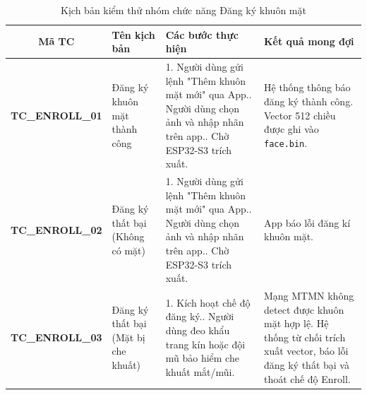 \begin{table}[H]
    \centering
    \caption{Kịch bản kiểm thử nhóm chức năng Đăng ký khuôn mặt}
    \label{tab:tc_enroll}
    \small
    \begin{tabularx}{\textwidth}{|c|X|X|X|}
\hline
\textbf{Mã TC} & \textbf{Tên kịch bản} & \textbf{Các bước thực hiện} & \textbf{Kết quả mong đợi} \\
\hline
\textbf{TC\_ENROLL\_01} & Đăng ký khuôn mặt thành công &
1. Người dùng gửi lệnh "Thêm khuôn mặt mới" qua App.\newline
2. Người dùng chọn ảnh và nhập nhãn trên app.\newline
3. Chờ ESP32-S3 trích xuất. &
Hệ thống thông báo đăng ký thành công. Vector 512 chiều được ghi vào \texttt{face.bin}.\\
\hline
\textbf{TC\_ENROLL\_02} & Đăng ký thất bại (Không có mặt) &
1. Người dùng gửi lệnh "Thêm khuôn mặt mới" qua App.\newline
2. Người dùng chọn ảnh và nhập nhãn trên app.\newline
3. Chờ ESP32-S3 trích xuất. & App báo lỗi đăng kí khuôn mặt. \\
\hline
\textbf{TC\_ENROLL\_03} & Đăng ký thất bại (Mặt bị che khuất) &
1. Kích hoạt chế độ đăng ký.\newline
2. Người dùng đeo khẩu trang kín hoặc đội mũ bảo hiểm che khuất mắt/mũi. &
Mạng MTMN không detect được khuôn mặt hợp lệ. Hệ thống từ chối trích xuất vector, báo lỗi đăng ký thất bại và thoát chế độ Enroll. \\
\hline
    \end{tabularx}
\end{table}